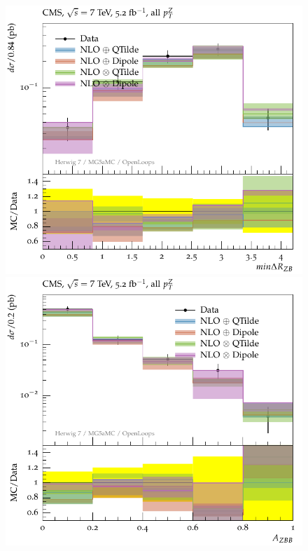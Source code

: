 \documentclass[11pt]{cernrep}
\begin{document}
\begin{figure}[htbp]
   \includegraphics[scale=0.65]{figs/zbb/herwigzb/cms-d03-x01-y01.pdf} 
   \includegraphics[scale=0.65]{figs/zbb/herwigzb/cms-d04-x01-y01.pdf} 

\end{figure}
\end{document}
